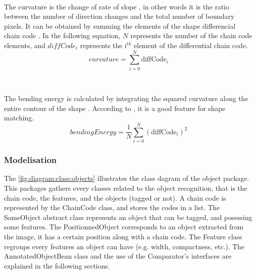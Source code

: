 ~~ 

The curvature is the change of rate of slope \cite{bib:chain:ObjectDescription}, in other words it is the ratio between the number of direction changes and the total number of boundary pixels. It can be obtained by summing the elements of the shape differencial chain code  \cite{bib:chain:ShapeRepresentationDescription}. In the following equation, $N$ represents the number of the chain code elements, and $diffCode_i$ represents the i$^{th}$ element of the differential chain code. 
\begin{equation}
curvature = \sum_{i = 0}^{N} \text{diffCode}_i
\end{equation}


~~

The bending energy is calculated by integrating the squared curvature along the entire contour of the shape \cite{bib:chain:ShapeRepresentationDescription}. According to \cite{bib:chain:ShapeDescriptionLesson}, it is a good feature for shape matching. 
\begin{equation}
bendingEnergy = \frac{1}{N} \sum_{i = 0}^{N} (\text{diffCode}_i)^{2}
\end{equation}


\subsubsection{Modelisation}


The \vref{fig:diagram:class:objects} illustrates the class dagram of the object package. This packages gathers every classes related to the object recognition, that is the chain code, the features, and the objects (tagged or not). A chain code is represented by the ChainCode class, and stores the codes in a list. The SomeObject abstract class represents an object that can be tagged, and posessing some features. The PositionnedObject corresponds to an object extracted from the image, it has a certain position along with a chain code. The Feature class regroups every features an object can have (e.g. width, compactness, etc.). The AnnotatedObjectBean class and the use of the Comparator's interfaces are explained in the following sections. 


